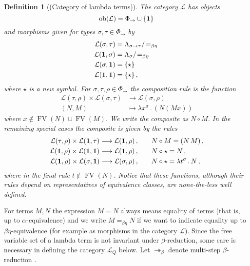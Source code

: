 \documentclass[english,letter paper,12pt,leqno]{article}
\def\ldot{\,.\,}
\def\typearrow{\Rightarrow}
\def\FV{\operatorname{FV}}
\theoremstyle{example}
\newtheorem{definition}[theorem]{Definition}
\numberwithin{equation}{section}
\newcommand{\call}[1]{\mathcal{#1}}
\def\ldot{\,.\,}
\def\FV{\operatorname{FV}}
\def\typearrow{\rightarrow}
\begin{document}
\begin{definition}[(Category of lambda terms)]\label{definition:lambda_cat} The category $\call{L}$ has objects
	\[
	\operatorname{ob}(\call{L}) = \Phi_{\typearrow} \cup \{ \bold{1} \}
	\]
	and morphisms given for types $\sigma, \tau \in \Phi_{\typearrow}$ by
	\begin{align*}
		\call{L}(\sigma, \tau) &= \Lambda_{\sigma \typearrow \tau}/\!=_{\beta\eta}\,\\
		\call{L}(\bold{1}, \sigma) &= \Lambda_{\sigma}/\!=_{\beta\eta}\,\\
		\call{L}(\sigma, \bold{1}) &= \{ \star \}\,\\
		\call{L}(\bold{1},\bold{1}) &= \{ \star \}\,,
	\end{align*}
	where $\star$ is a new symbol. For $\sigma, \tau, \rho \in \Phi_{\typearrow}$ the composition rule is the function
	\begin{align}
		\label{eq:tttt}\call{L}(\tau, \rho) \times \call{L}(\sigma, \tau) &\longrightarrow \call{L}(\sigma, \rho)\\
		(N,M) &\longmapsto \lambda x^\sigma \ldot (N (M x))
	\end{align}
	where $x \not\in \FV(N) \cup \FV(M)$. We write the composite as $N \circ M$. In the remaining special cases the composite is given by the rules
	\begin{align}
		\label{eq:ttct}\call{L}(\tau, \rho) \times \call{L}(\bold{1}, \tau) \longrightarrow \call{L}(\bold{1}, \rho)\,, \qquad & N \circ M = (N \, M)\,,\\
		\label{eq:ctcc}\call{L}(\bold{1}, \rho) \times \call{L}(\bold{1}, \bold{1}) \longrightarrow \call{L}(\bold{1}, \rho)\,, \qquad & N \circ \star = N\,,\\
		\label{eq:cttc}\call{L}(\bold{1}, \rho) \times \call{L}(\sigma, \bold{1}) \longrightarrow \call{L}(\sigma, \rho)\,, \qquad & N \circ \star = \lambda t^\sigma \ldot N\,,
	\end{align}
	where in the final rule $t \notin \FV(N)$. Notice that these functions, although their rules depend on representatives of equivalence classes, are none-the-less well defined.
\end{definition}

For terms $M,N$ the expression $M = N$ always means equality of terms (that is, up to $\alpha$-equivalence) and we write $M =_{\beta\eta} N$ if we want to indicate equality up to $\beta\eta$-equivalence (for example as morphisms in the category $\call{L}$). Since the free variable set of a lambda term is not invariant under $\beta$-reduction, some care is necessary in defining the category $\call{L}_Q$ below. Let $\twoheadrightarrow_\beta$ denote multi-step $\beta$-reduction \cite[Definition 1.3.3]{sorensen}.
\end{document}
